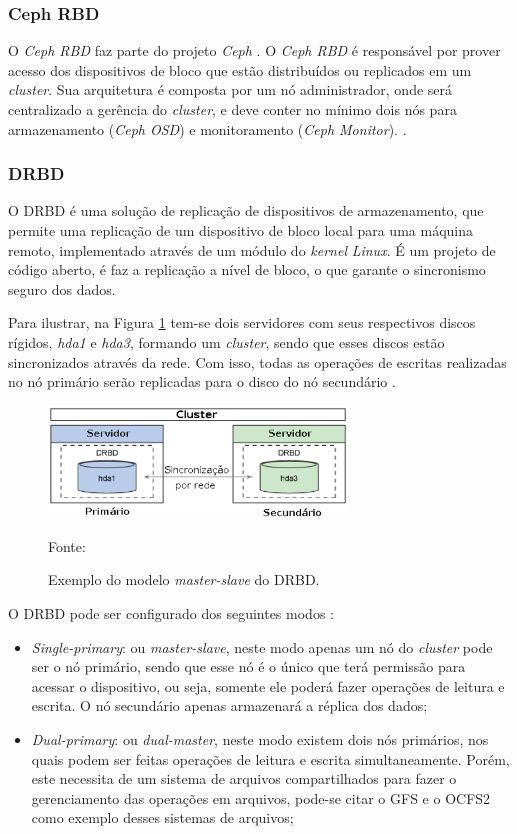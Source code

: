 \subsubsection{Ceph RBD}
\label{section:cephrbd}
O \textit{Ceph RBD} \cite{cephrbd} faz parte do projeto \textit{Ceph} \cite{ceph}. O \textit{Ceph RBD} é responsável por prover acesso dos 
dispositivos de bloco que estão distribuídos ou replicados em um \textit{cluster}. Sua arquitetura é composta por um nó administrador, onde será
centralizado a gerência do \textit{cluster}, e deve conter no mínimo dois nós para armazenamento (\textit{Ceph OSD}) e monitoramento 
(\textit{Ceph Monitor}).
\cite{ceph}.

\subsubsection{DRBD}
\label{section:drbd}
O \ac{DRBD} \cite{drbd} é uma solução de replicação de dispositivos de armazenamento, que permite uma replicação de um dispositivo de bloco local 
para uma máquina remoto, implementado através de um módulo do \textit{kernel} \textit{Linux}. É um projeto de código aberto, é faz a replicação a 
nível de bloco, o que garante o sincronismo seguro dos dados. 

Para ilustrar, na Figura \ref{fig:drbd_basic} tem-se dois servidores com seus respectivos discos rígidos, \textit{hda1} e \textit{hda3}, formando 
um \textit{cluster}, sendo que esses discos estão sincronizados através da rede. Com isso, todas as operações de escritas realizadas no nó primário 
serão replicadas para o disco do nó secundário \cite{zaminhani2008}.

\begin{figure}[h!]
 \centering
 \includegraphics[width=300px]{img/drbd_basic.eps}
 \caption{Exemplo do modelo \textit{master-slave} do \ac{DRBD}.}
 Fonte: \citet{jones2010}
 \label{fig:drbd_basic}
\end{figure}

O \ac{DRBD} pode ser configurado dos seguintes modos \cite{drbd}:
\begin{itemize}
 \item \textit{Single-primary}: ou \textit{master-slave}, neste modo apenas um nó do \textit{cluster} pode ser o nó primário, sendo que esse nó 
 é o único que terá permissão para acessar o dispositivo, ou seja, somente ele poderá fazer operações de leitura e escrita. O nó 
 secundário apenas armazenará a réplica dos dados;
 \item \textit{Dual-primary}: ou \textit{dual-master}, neste modo existem dois nós primários, nos quais podem ser feitas operações de leitura e 
 escrita simultaneamente. Porém, este necessita de um sistema de arquivos compartilhados para fazer o gerenciamento das operações em arquivos, 
 pode-se citar o \ac{GFS} \cite{gfs} e o \ac{OCFS2} \cite{ocfs2} como exemplo desses sistemas de arquivos;
\end{itemize}

